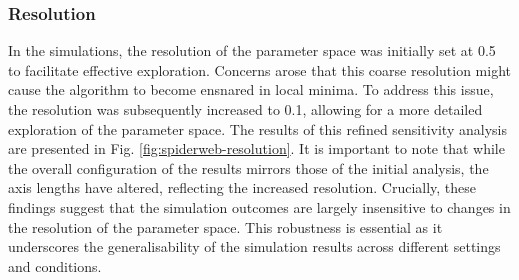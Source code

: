 \documentclass[12pt]{article}
\begin{document}
\subsubsection{Resolution}
In the simulations, the resolution of the parameter space was initially set at 0.5 to facilitate effective exploration. Concerns arose that this coarse resolution might cause the algorithm to become ensnared in local minima. To address this issue, the resolution was subsequently increased to 0.1, allowing for a more detailed exploration of the parameter space. The results of this refined sensitivity analysis are presented in Fig. \ref{fig:spiderweb-resolution}. It is important to note that while the overall configuration of the results mirrors those of the initial analysis, the axis lengths have altered, reflecting the increased resolution. Crucially, these findings suggest that the simulation outcomes are largely insensitive to changes in the resolution of the parameter space. This robustness is essential as it underscores the generalisability of the simulation results across different settings and conditions.
\end{document}
